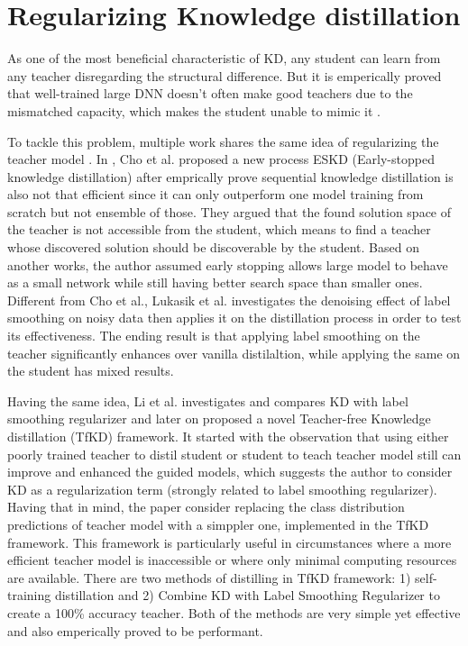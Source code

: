 \section{Regularizing Knowledge distillation}
As one of the most beneficial characteristic of KD, any student can learn from any teacher disregarding the structural difference. But it is emperically proved that well-trained large DNN doesn't often make good teachers due to the mismatched capacity, which makes the student unable to mimic it \cite{complexitygap}. 

To tackle this problem, multiple work shares the same idea of regularizing the teacher model \cite{complexitygap, labelsmoothingnoise}. In \cite{complexitygap}, Cho et al. proposed a new process ESKD (Early-stopped knowledge distillation) after emprically prove sequential knowledge distillation is also not that efficient since it can only outperform one model training from scratch but not ensemble of those. They argued that the found solution space of the teacher is not accessible from the student, which means to find a teacher whose discovered solution should be discoverable by the student. Based on another works, the author assumed early stopping allows large model to behave as a small network while still having better search space than smaller ones. Different from Cho et al., Lukasik et al. \cite{labelsmoothingnoise} investigates the denoising effect of label smoothing on noisy data then applies it on the distillation process in order to test its effectiveness. The ending result is that applying label smoothing on the teacher significantly enhances over vanilla distilaltion, while applying the same on the student has mixed results.

Having the same idea, Li et al. \cite{teacherfree} investigates and compares KD with label smoothing regularizer and later on proposed a novel Teacher-free Knowledge distillation (TfKD) framework. It started with the observation that using either poorly trained teacher to distil student or student to teach teacher model still can improve and enhanced the guided models, which suggests the author to consider KD as a regularization term (strongly related to label smoothing regularizer). Having that in mind, the paper consider replacing the class distribution predictions of teacher model with a simppler one, implemented in the TfKD framework. This framework is particularly useful in circumstances where a more efficient teacher model is inaccessible or where only minimal computing resources are available. There are two methods of distilling in TfKD framework: 1) self-training distillation and 2) Combine KD with Label Smoothing Regularizer to create a 100\% accuracy teacher. Both of the methods are very simple yet effective and also emperically proved to be performant.